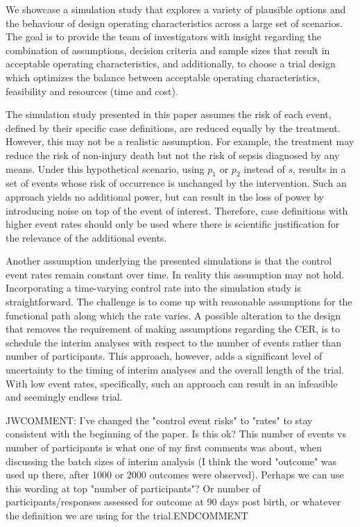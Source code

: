\documentclass[12pt]{article}
\begin{document}
We showcase a simulation study that explores a variety of plausible options and the behaviour of design operating characteristics across a large set of scenarios. The goal is to provide the team of investigators with insight regarding the combination of assumptions, decision criteria and sample sizes that result in acceptable operating characteristics, and additionally, to choose a trial design which optimizes the balance between acceptable operating characteristics, feasibility and resources (time and cost).

The simulation study presented in this paper assumes the risk of each event, defined by their specific case definitions, are reduced equally by the treatment.   However, this may not be a realistic assumption. For example, the treatment may reduce the risk of non-injury death but not the risk of sepsis diagnosed by any means. Under this hypothetical scenario, using $p_1$ or $p_2$ instead of $s$, results in a set of events whose risk of occurrence is unchanged by the intervention. Such an approach yields no additional power, but can result in the loss of power by introducing noise on top of the event of interest. Therefore, case definitions with higher event rates should only be used where there is scientific justification for the relevance of the additional events.

Another assumption underlying the presented simulations is that the control event rates remain constant over time. In reality this assumption may not hold. Incorporating a time-varying control rate into the simulation study is straightforward. The challenge is to come up with reasonable assumptions for the functional path along which the rate varies. A possible alteration to the design that removes the requirement of making assumptions regarding the CER, is to schedule the interim analyses with respect to the number of events rather than number of participants. This approach, however, adds a significant level of uncertainty to the timing of interim analyses and the overall length of the trial. With low event rates, specifically, such an approach can result in an infeasible and seemingly endless trial. 

JWCOMMENT: I've changed the "control event risks" to "rates" to stay consistent with the beginning of the paper. Is this ok? This number of events vs number of participants is what one of my first comments was about, when discussing the batch sizes of interim analysis (I think the word "outcome" was used up there, after 1000 or 2000 outcomes were observed).  Perhaps we can use this wording at top "number of participants"?  Or number of participants/responses assessed for outcome at 90 days post birth, or whatever the definition we are using for the trial.ENDCOMMENT
\end{document}
